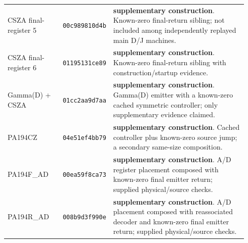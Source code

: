 {\begin{longtable}{@{}>{\raggedright\arraybackslash}p{0.23\linewidth}>{\raggedright\arraybackslash}p{0.145\linewidth}>{\raggedright\arraybackslash}p{0.56\linewidth}@{}}
CSZA final-register 5 & \texttt{00c989810d4b} & \textbf{supplementary construction}. Known-zero final-return sibling; not included among independently replayed main D/J machines.\\[4pt]
CSZA final-register 6 & \texttt{01195131ce89} & \textbf{supplementary construction}. Known-zero final-return sibling with construction/startup evidence.\\[4pt]
Gamma(D) + CSZA & \texttt{01cc2aa9d7aa} & \textbf{supplementary construction}. Gamma(D) emitter with a known-zero cached symmetric controller; only supplementary evidence claimed.\\[4pt]
PA194CZ & \texttt{04e51ef4bb79} & \textbf{supplementary construction}. Cached controller plus known-zero source jump; a secondary same-size composition.\\[4pt]
PA194F\_AD & \texttt{00ea59f8ca73} & \textbf{supplementary construction}. A/D register placement composed with known-zero final emitter return; supplied physical/source checks.\\[4pt]
PA194R\_AD & \texttt{008b9d3f990e} & \textbf{supplementary construction}. A/D placement composed with reassociated decoder and known-zero final emitter return; supplied physical/source checks.\\[4pt]
\bottomrule
\end{longtable}
}
